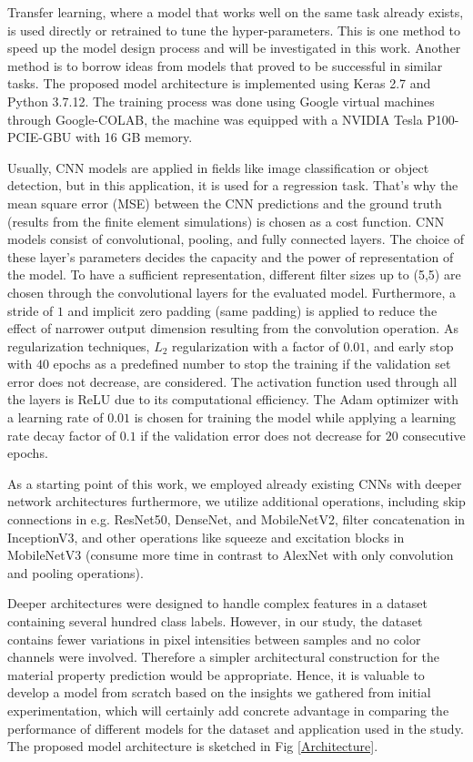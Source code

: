 \documentclass[final,3p,times]{elsarticle}
\begin{document}
Transfer learning, where a model that works well on the same task already exists, is used directly or retrained to tune the hyper-parameters. This is one method to speed up the model design process and will be investigated in this work. Another method is to borrow ideas from models that proved to be successful in similar tasks. The proposed model architecture is implemented using Keras 2.7 and Python 3.7.12. The training process was done using Google virtual machines through Google-COLAB, the machine was equipped with a NVIDIA Tesla P100-PCIE-GBU with 16 GB memory.

Usually, CNN models are applied in fields like image classification or object detection, but in this application, it is used for a regression task. That's why the mean square error (MSE) between the CNN predictions and the ground truth (results from the finite element simulations) is chosen as a cost function. CNN models consist of convolutional, pooling, and fully connected layers. The choice of these layer's parameters decides the capacity and the power of representation of the model. To have a sufficient representation, different filter sizes up to (5,5) are chosen through the convolutional layers for the evaluated model. Furthermore, a stride of $1$ and implicit zero padding (same padding) is applied to reduce the effect of narrower output dimension resulting from the convolution operation. As regularization techniques, $L_2$ regularization with a factor of $0.01$, and early stop with $40$ epochs as a predefined number to stop the training if the validation set error does not decrease, are considered. The activation function used through all the layers is ReLU due to its computational efficiency. The Adam optimizer with a learning rate of $0.01$ is chosen for training the model while applying a learning rate decay factor of $0.1$ if the validation error does not decrease for $20$ consecutive epochs. 

As a starting point of this work, we employed already existing CNNs with deeper network architectures \cite{rao2020three,yang2018deep,beniwal2019deep} furthermore, we utilize additional operations, including skip connections in e.g. ResNet50, DenseNet, and MobileNetV2, filter concatenation in InceptionV3, and other operations like squeeze and excitation blocks in MobileNetV3 (consume more time in contrast to AlexNet with only convolution and pooling operations).

Deeper architectures were designed to handle complex features in a dataset containing several hundred class labels. However, in our study, the dataset contains fewer variations in pixel intensities between samples and no color channels were involved. Therefore a simpler architectural construction for the material property prediction would be appropriate. Hence, it is valuable to develop a model from scratch based on the insights we gathered from initial experimentation, which will certainly add concrete advantage in comparing the performance of different models for the dataset and application used in the study. The proposed model architecture is sketched in Fig \ref{Architecture}.
\end{document}
